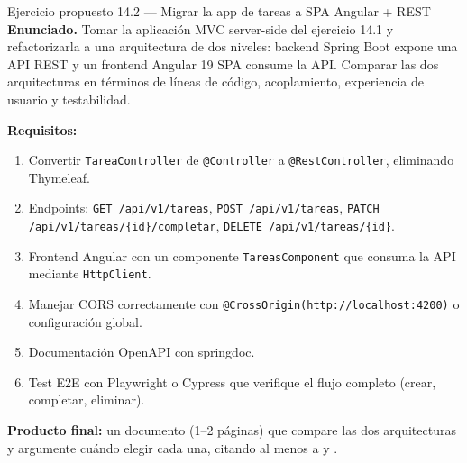 \documentclass[11pt,a4paper,openany]{book}
\begin{document}
\begin{cajaejercicio}{Ejercicio propuesto 14.2 --- Migrar la app de tareas a SPA Angular + REST}
\textbf{Enunciado.} Tomar la aplicación MVC server-side del ejercicio
14.1 y refactorizarla a una arquitectura de dos niveles: backend Spring
Boot expone una API REST y un frontend Angular 19 SPA consume la API.
Comparar las dos arquitecturas en términos de líneas de código,
acoplamiento, experiencia de usuario y testabilidad.

\textbf{Requisitos:}
\begin{enumerate}
\item Convertir \texttt{TareaController} de \texttt{@Controller} a
\texttt{@RestController}, eliminando Thymeleaf.
\item Endpoints: \texttt{GET /api/v1/tareas},
\texttt{POST /api/v1/tareas}, \texttt{PATCH /api/v1/tareas/\{id\}/completar},
\texttt{DELETE /api/v1/tareas/\{id\}}.
\item Frontend Angular con un componente \texttt{TareasComponent}
que consuma la API mediante \texttt{HttpClient}.
\item Manejar CORS correctamente con
\texttt{@CrossOrigin(http://localhost:4200)} o configuración
global.
\item Documentación OpenAPI con springdoc.
\item Test E2E con Playwright o Cypress que verifique el flujo
completo (crear, completar, eliminar).
\end{enumerate}

\textbf{Producto final:} un documento (1--2 páginas) que compare las
dos arquitecturas y argumente cuándo elegir cada una, citando al
menos a \cite{galloway2011mvc} y \cite{richardson2007restful}.
\end{cajaejercicio}

%
%

\end{document}
